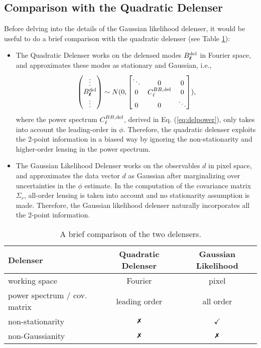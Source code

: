 \documentclass[aps, prd, reprint, nofootinbib, groupedaddress, showpacs]{revtex4-1}
\newcommand*\Bell{\ensuremath{\boldsymbol\ell}}
\newcommand{\xmark}{\text{\ding{55}}}
\begin{document}
\subsection{Comparison with the Quadratic Delenser}
Before delving into the details of the Gaussian likelihood delenser,
it would be useful to do a brief comparison with the quadratic delenser (see Table \ref{table1}):
\begin{itemize}
    \item The Quadratic Delenser works on the delensed modes $B^{\rm del}_{\Bell}$ in Fourier space,
    and approximates these modes as stationary and Gaussian, i.e.,
    \[
    \begin{pmatrix}
        \vdots \\
        B^{\rm del}_{\Bell}\\
        \vdots
    \end{pmatrix} \sim
    N(0, \begin{bmatrix}
    \ddots & 0 & 0 \\
    0 & C^{BB,\rm del}_{\ell} & 0\\
    0 & 0 & \ddots
    \end{bmatrix}),
    \]
    where the power spectrum $C^{BB,\rm del}_{\ell}$, derived in Eq. (\ref{eq:delpower}), only
    takes into account the leading-order in $\phi$.
    Therefore, the quadratic delenser exploits the 2-point information in
    a biased way by ignoring the non-stationarity and higher-order lensing in the power spectrum.

    \item The Gaussian Likelihood  Delenser works on the observables $d$ in pixel space, and approximates the data
    vector $d$ as Gaussian after marginalizing over uncertainties in the $\phi$ estimate. In the computation of
    the covariance matrix $\Sigma_r$, all-order lensing is taken into account
    and no stationarity assumption is made. Therefore, the Gaussian likelihood
    delenser naturally incorporates all the 2-point information.
\end{itemize}

\begin{table}
\begin{tabular}{ m{2.4cm} |c| c}
      Delenser & Quadratic Delenser  & Gaussian Likelihood  \\ \hline
     working space  & Fourier & pixel\\ \hline
      power spectrum / cov. matrix & leading order & all order\\ \hline
     non-stationarity& $\xmark $ & $\checkmark$ \\
     non-Gaussianity &  $\xmark $ & $\xmark $ \\ \hline
\end{tabular}
\caption{A brief comparison of the two delensers.}
\label{table1}
\end{table}
\end{document}
